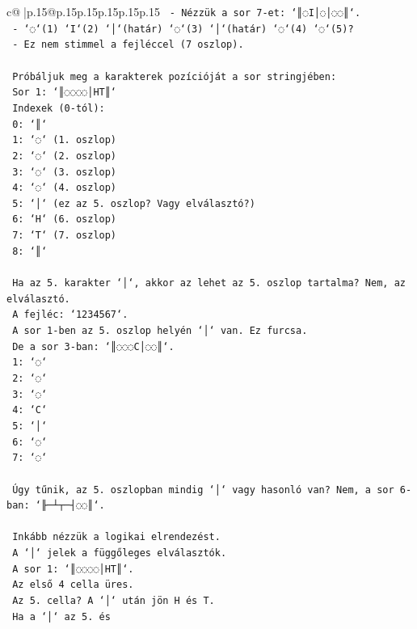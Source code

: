 \documentclass{article}
\begin{document}
{\begin{supertabular}{c@{$\;$}|p{.15\linewidth}@{}p{.15\linewidth}p{.15\linewidth}p{.15\linewidth}p{.15\linewidth}p{.15\linewidth}}
{{{\texttt{        {-} Nézzük a sor 7{-}et: `║◌I│◌│◌◌║`.} \\
\texttt{        {-} `◌`(1) `I`(2) `│`(határ) `◌`(3) `│`(határ) `◌`(4) `◌`(5)?} \\
\texttt{        {-} Ez nem stimmel a fejléccel (7 oszlop).} \\
\\ 
\texttt{      Próbáljuk meg a karakterek pozícióját a sor stringjében:} \\
\texttt{      Sor 1: `║◌◌◌◌│HT║`} \\
\texttt{      Indexek (0{-}tól):} \\
\texttt{      0: `║`} \\
\texttt{      1: `◌` (1. oszlop)} \\
\texttt{      2: `◌` (2. oszlop)} \\
\texttt{      3: `◌` (3. oszlop)} \\
\texttt{      4: `◌` (4. oszlop)} \\
\texttt{      5: `│` (ez az 5. oszlop? Vagy elválasztó?)} \\
\texttt{      6: `H` (6. oszlop)} \\
\texttt{      7: `T` (7. oszlop)} \\
\texttt{      8: `║`} \\
\\ 
\texttt{      Ha az 5. karakter `│`, akkor az lehet az 5. oszlop tartalma? Nem, az elválasztó.} \\
\texttt{      A fejléc: `1234567`.} \\
\texttt{      A sor 1{-}ben az 5. oszlop helyén `│` van. Ez furcsa.} \\
\texttt{      De a sor 3{-}ban: `║◌◌◌C│◌◌║`.} \\
\texttt{      1: `◌`} \\
\texttt{      2: `◌`} \\
\texttt{      3: `◌`} \\
\texttt{      4: `C`} \\
\texttt{      5: `│`} \\
\texttt{      6: `◌`} \\
\texttt{      7: `◌`} \\
\\ 
\texttt{      Úgy tűnik, az 5. oszlopban mindig `│` vagy hasonló van? Nem, a sor 6{-}ban: `╟─┴┬─┤◌◌║`.} \\
\\ 
\texttt{      Inkább nézzük a logikai elrendezést.} \\
\texttt{      A `│` jelek a függőleges elválasztók.} \\
\texttt{      A sor 1: `║◌◌◌◌│HT║`.} \\
\texttt{      Az első 4 cella üres.} \\
\texttt{      Az 5. cella? A `│` után jön H és T.} \\
\texttt{      Ha a `│` az 5. és} \\
            }
        }
    }
     \\ \\


\end{supertabular}}
\end{document}
